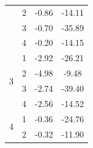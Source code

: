 \begin{table}[H]
\begin{tabular}{|c|c|c|c|}
    & 2                                                                            & -0.86                                                                            & -14.11                                                                           \\ \cline{2-4} 
    & 3                                                                            & -0.70                                                                            & -35.89                                                                           \\ \cline{2-4} 
    & 4                                                                            & -0.20                                                                            & -14.15                                                                           \\ \hline
  \multirow{4}{*}{3}                                                           & 1                                                                            & -2.92                                                                            & -26.21                                                                           \\ \cline{2-4} 
    & 2                                                                            & -4.98                                                                            & -9.48                                                                            \\ \cline{2-4} 
    & 3                                                                            & -2.74                                                                            & -39.40                                                                           \\ \cline{2-4} 
    & 4                                                                            & -2.56                                                                            & -14.52                                                                           \\ \hline
  \multirow{4}{*}{4}                                                           & 1                                                                            & -0.36                                                                            & -24.76                                                                           \\ \cline{2-4} 
    & 2                                                                            & -0.32                                                                            & -11.90                                                                           \\ \cline{2-4} 

\end{tabular}
\end{table}
